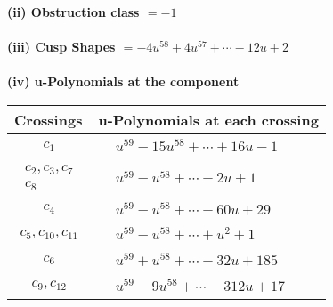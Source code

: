 \documentclass[1p]{elsarticle_modified}
\theoremstyle{definition}
\begin{document}
\flushleft \textbf{(ii) Obstruction class $= -1$}\\~\\
\flushleft \textbf{(iii) Cusp Shapes $= -4 u^{58}+4 u^{57}+\cdots-12 u+2$}\\~\\
\newpage\renewcommand{\arraystretch}{1}
\flushleft \textbf{(iv) u-Polynomials at the component}\newline \\
\begin{tabular}{m{50pt}|m{274pt}}
Crossings & \hspace{64pt}u-Polynomials at each crossing \\
\hline $$\begin{aligned}c_{1}\end{aligned}$$&$\begin{aligned}
&u^{59}-15 u^{58}+\cdots+16 u-1
\end{aligned}$\\
\hline $$\begin{aligned}c_{2},c_{3},c_{7}\\c_{8}\end{aligned}$$&$\begin{aligned}
&u^{59}- u^{58}+\cdots-2 u+1
\end{aligned}$\\
\hline $$\begin{aligned}c_{4}\end{aligned}$$&$\begin{aligned}
&u^{59}- u^{58}+\cdots-60 u+29
\end{aligned}$\\
\hline $$\begin{aligned}c_{5},c_{10},c_{11}\end{aligned}$$&$\begin{aligned}
&u^{59}- u^{58}+\cdots+u^2+1
\end{aligned}$\\
\hline $$\begin{aligned}c_{6}\end{aligned}$$&$\begin{aligned}
&u^{59}+u^{58}+\cdots-32 u+185
\end{aligned}$\\
\hline $$\begin{aligned}c_{9},c_{12}\end{aligned}$$&$\begin{aligned}
&u^{59}-9 u^{58}+\cdots-312 u+17
\end{aligned}$\\
\hline
\end{tabular}\\~\\
\end{document}
